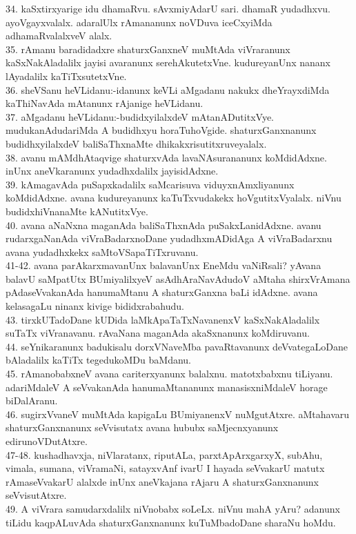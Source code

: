 \documentclass{article}
\begin{document}
34. kaSxtirxyarige idu dhamaRvu. sAvxmiyAdarU sari. dhamaR yudadhxvu. ayoVgayxvalalx. adaralUlx rAmananunx noVDuva iceCxyiMda adhamaRvalalxveV alalx.\\
35. rAmanu baradidadxre shaturxGanxneV muMtAda viVraranunx kaSxNakAladalilx jayisi avaranunx serehAkutetxVne. kudureyanUnx nananx lAyadalilx kaTiTxsutetxVne.\\
36. sheVSanu heVLidanu:-idanunx keVLi aMgadanu nakukx dheYrayxdiMda kaThiNavAda mAtanunx rAjanige heVLidanu.\\
37. aMgadanu heVLidanu:-budidxyilalxdeV mAtanADutitxVye. mudukanAdudariMda A budidhxyu horaTuhoVgide. shaturxGanxnanunx budidhxyilalxdeV baliSaThxnaMte dhikakxrisutitxruveyalalx.\\
38. avanu mAMdhAtaqvige shaturxvAda lavaNAsurananunx koMdidAdxne. inUnx aneVkaranunx yudadhxdalilx jayisidAdxne.\\
39. kAmagavAda puSapxkadalilx saMcarisuva viduyxnAmxliyanunx koMdidAdxne. avana kudureyanunx kaTuTxvudakekx hoVgutitxVyalalx. niVnu budidxhiVnanaMte kANutitxVye.\\
40. avana aNaNxna maganAda baliSaThxnAda puSakxLanidAdxne. avanu rudarxgaNanAda viVraBadarxnoDane yudadhxmADidAga A viVraBadarxnu avana yudadhxkekx saMtoVSapaTiTxruvanu.\\
41-42. avana parAkarxmavanUnx balavanUnx EneMdu vaNiRsali? yAvana balavU saMpatUtx BUmiyalilxyeV asAdhAraNavAdudoV aMtaha shirxVrAmana pAdaseVvakanAda hanumaMtanu A shaturxGanxna baLi idAdxne. avana kelasagaLu ninanx kivige bididxrabahudu.\\
43. tirxkUTadoDane kUDida laMkApaTaTxNavanenxV kaSxNakAladalilx suTaTx viVranavanu. rAvaNana maganAda akaSxnanunx koMdiruvanu.\\
44. seYnikaranunx badukisalu dorxVNaveMba pavaRtavanunx deVvategaLoDane bAladalilx kaTiTx tegedukoMDu baMdanu.\\
45. rAmanobabxneV avana cariterxyanunx balalxnu. matotxbabxnu tiLiyanu. adariMdaleV A seVvakanAda hanumaMtananunx manasisxniMdaleV horage biDalAranu.\\
46. sugirxVvaneV muMtAda kapigaLu BUmiyanenxV nuMgutAtxre. aMtahavaru shaturxGanxnanunx seVvisutatx avana hububx saMjecnxyanunx edirunoVDutAtxre.\\
47-48. kushadhavxja, niVlaratanx, riputALa, parxtApArxgarxyX, subAhu, vimala, sumana, viVramaNi, satayxvAnf ivarU I hayada seVvakarU matutx rAmaseVvakarU alalxde inUnx aneVkajana rAjaru A shaturxGanxnanunx seVvisutAtxre.\\
49. A viVrara samudarxdalilx niVnobabx soLeLx. niVnu mahA yAru? adanunx tiLidu kaqpALuvAda shaturxGanxnanunx kuTuMbadoDane sharaNu hoMdu.\\
\end{document}
